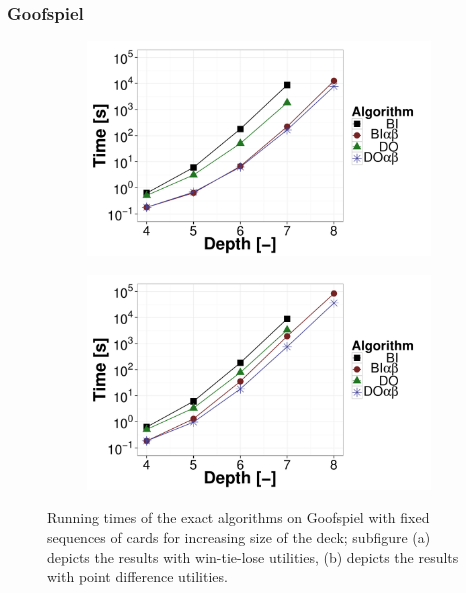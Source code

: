 \subsubsection{Goofspiel}
\begin{figure}[t!]
\centering
	\begin{subfigure}{0.49\textwidth}
 		\includegraphics[width=1\textwidth]{figures/GS-BT-NF.pdf}\caption{}\label{fig:off:res:gs-bt}
 	\end{subfigure}
	\begin{subfigure}{0.49\textwidth}
 		\includegraphics[width=1\textwidth]{figures/GS-BF-NF.pdf}\caption{}\label{fig:off:res:gs-bf}
 	\end{subfigure}
\caption{Running times of the exact algorithms on Goofspiel with fixed sequences of cards for increasing size of the deck; subfigure (a) depicts the results with win-tie-lose utilities, (b) depicts the results with point difference utilities.} \label{fig:off:res:gs}
\end{figure}


